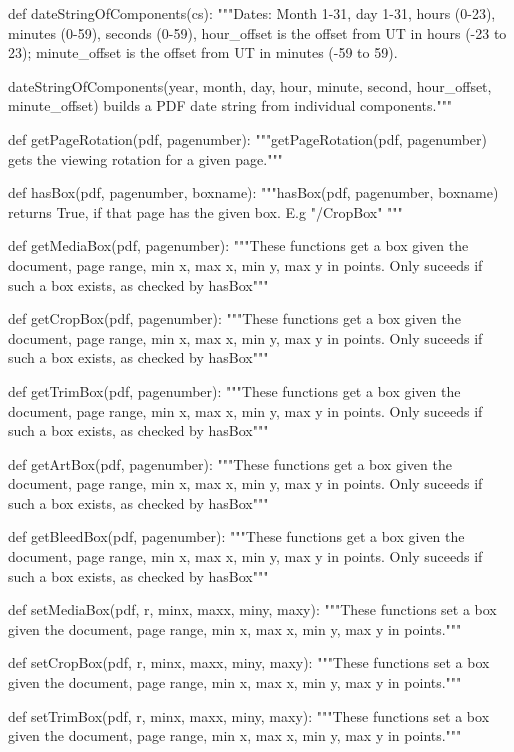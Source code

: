 def dateStringOfComponents(cs):
    """Dates: Month 1-31, day 1-31, hours (0-23), minutes (0-59), seconds
    (0-59), hour_offset is the offset from UT in hours (-23 to 23);
    minute_offset is the offset from UT in minutes (-59 to 59).

    dateStringOfComponents(year, month, day, hour, minute, second,
    hour_offset, minute_offset) builds a PDF date string from individual
    components."""

def getPageRotation(pdf, pagenumber):
    """getPageRotation(pdf, pagenumber) gets the viewing rotation for a given
    page."""

def hasBox(pdf, pagenumber, boxname):
    """hasBox(pdf, pagenumber, boxname) returns True, if that page has the
    given box. E.g "/CropBox" """

def getMediaBox(pdf, pagenumber):
    """These functions get a box given the document, page range, min x, max x,
    min y, max y in points. Only suceeds if such a box exists, as checked by
    hasBox"""

def getCropBox(pdf, pagenumber):
    """These functions get a box given the document, page range, min x, max x,
    min y, max y in points. Only suceeds if such a box exists, as checked by
    hasBox"""

def getTrimBox(pdf, pagenumber):
    """These functions get a box given the document, page range, min x, max x,
    min y, max y in points. Only suceeds if such a box exists, as checked by
    hasBox"""

def getArtBox(pdf, pagenumber):
    """These functions get a box given the document, page range, min x, max x,
    min y, max y in points. Only suceeds if such a box exists, as checked by
    hasBox"""

def getBleedBox(pdf, pagenumber):
    """These functions get a box given the document, page range, min x, max x,
    min y, max y in points. Only suceeds if such a box exists, as checked by
    hasBox"""

def setMediaBox(pdf, r, minx, maxx, miny, maxy):
    """These functions set a box given the document, page range, min x, max x,
    min y, max y in points."""

def setCropBox(pdf, r, minx, maxx, miny, maxy):
    """These functions set a box given the document, page range, min x, max x,
    min y, max y in points."""

def setTrimBox(pdf, r, minx, maxx, miny, maxy):
    """These functions set a box given the document, page range, min x, max x,
    min y, max y in points."""

